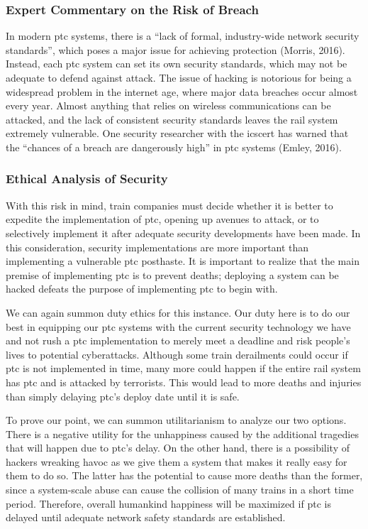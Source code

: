 \documentclass[11pt, titlepage]{article}
\begin{document}
\subsubsection{Expert Commentary on the Risk of Breach}

In modern \gls{ptc} systems, there is a ``lack of formal, industry-wide network
security standards'', which poses a major issue for achieving protection (Morris,
2016). Instead, each \gls{ptc} system can set its own security standards, which may
not be adequate to defend against attack. The issue of hacking is notorious for
being a widespread problem in the internet age, where major data breaches occur
almost every year. Almost anything that relies on wireless communications can be
attacked, and the lack of consistent security standards leaves the rail system
extremely vulnerable. One security researcher with  the \gls{icscert} has warned
that the ``chances of a breach are dangerously high'' in \gls{ptc} systems (Emley,
2016).

\subsubsection{Ethical Analysis of Security}

With this risk in mind, train companies must decide whether it is better to expedite
the implementation of \gls{ptc}, opening up avenues to attack, or to selectively
implement it after adequate security developments have been made. In this
consideration, security implementations are more important than implementing a
vulnerable \gls{ptc} posthaste. It is important to realize that the main premise of
implementing \gls{ptc} is to prevent deaths; deploying a system can be hacked
defeats the purpose of implementing \gls{ptc} to begin with.

We can again summon duty ethics for this instance. Our duty here is to do our best
in equipping our \gls{ptc} systems with the current security technology we have and
not rush a \gls{ptc} implementation to merely meet a deadline and risk people’s
lives to potential cyberattacks. Although some train derailments could occur if
\gls{ptc} is not implemented in time, many more could happen if the entire rail
system has \gls{ptc} and is attacked by terrorists. This would lead to more deaths
and injuries than simply delaying \gls{ptc}’s deploy date until it is safe.

To prove our point, we can summon utilitarianism to analyze our two options. There
is a negative utility for the unhappiness caused by the additional tragedies that
will happen due to \gls{ptc}’s delay. On the other hand, there is a possibility of
hackers wreaking havoc as we give them a system that makes it really easy for them
to do so. The latter has the potential to cause more deaths than the former, since a
system-scale abuse can cause the collision of many trains in a short time period.
Therefore, overall humankind happiness will be maximized if \gls{ptc} is delayed
until adequate network safety standards are established.
\end{document}
